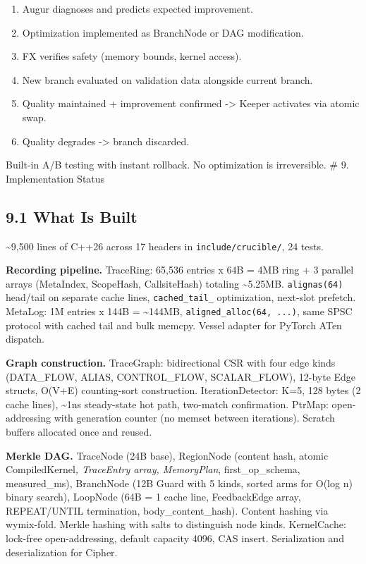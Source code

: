 \begin{enumerate}
\def\labelenumi{\arabic{enumi}.}
\tightlist
\item
  Augur diagnoses and predicts expected improvement.
\item
  Optimization implemented as BranchNode or DAG modification.
\item
  FX verifies safety (memory bounds, kernel access).
\item
  New branch evaluated on validation data alongside current branch.
\item
  Quality maintained + improvement confirmed -\textgreater{} Keeper activates via atomic swap.
\item
  Quality degrades -\textgreater{} branch discarded.
\end{enumerate}

Built-in A/B testing with instant rollback. No optimization is irreversible.
\# 9. Implementation Status

\subsection{9.1 What Is Built}\label{what-is-built}

\textasciitilde9,500 lines of C++26 across 17 headers in \texttt{include/crucible/}, 24 tests.

\textbf{Recording pipeline.} TraceRing: 65,536 entries x 64B = 4MB ring + 3 parallel arrays (MetaIndex, ScopeHash, CallsiteHash) totaling \textasciitilde5.25MB. \texttt{alignas(64)} head/tail on separate cache lines, \texttt{cached\_tail\_} optimization, next-slot prefetch. MetaLog: 1M entries x 144B = \textasciitilde144MB, \texttt{aligned\_alloc(64,\ ...)}, same SPSC protocol with cached tail and bulk memcpy. Vessel adapter for PyTorch ATen dispatch.

\textbf{Graph construction.} TraceGraph: bidirectional CSR with four edge kinds (DATA\_FLOW, ALIAS, CONTROL\_FLOW, SCALAR\_FLOW), 12-byte Edge structs, O(V+E) counting-sort construction. IterationDetector: K=5, 128 bytes (2 cache lines), \textasciitilde1ns steady-state hot path, two-match confirmation. PtrMap: open-addressing with generation counter (no memset between iterations). Scratch buffers allocated once and reused.

\textbf{Merkle DAG.} TraceNode (24B base), RegionNode (content hash, atomic CompiledKernel\emph{, TraceEntry array, MemoryPlan}, first\_op\_schema, measured\_ms), BranchNode (12B Guard with 5 kinds, sorted arms for O(log n) binary search), LoopNode (64B = 1 cache line, FeedbackEdge array, REPEAT/UNTIL termination, body\_content\_hash). Content hashing via wymix-fold. Merkle hashing with salts to distinguish node kinds. KernelCache: lock-free open-addressing, default capacity 4096, CAS insert. Serialization and deserialization for Cipher.


